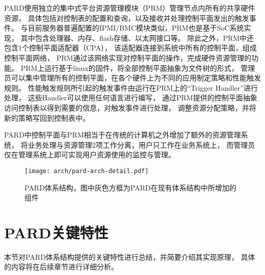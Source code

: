 PARD使用独立的集中式平台资源管理模块（PRM）管理节点内所有的共享硬件资源，
具体包括对控制表的配置和查询，以及接收并处理控制平面发出的触发事件。
与目前服务器普遍配置的IPMI/BMC模块类似，PRM也是基于SoC系统实现，
其中包含处理器、内存、flash存储、以太网接口等。
除此之外，PRM中还包含1个控制平面适配器（CPA），
该适配器连接到系统中所有的控制平面，组成控制平面网络，
PRM通过该网络实现对控制平面的操作，完成硬件资源管理的功能。
PRM上运行基于linux的固件，将全部控制平面抽象为文件树的形式，
管理员可以集中管理所有的控制平面，在各个硬件上为不同的应用制定策略和性能触发规则。
性能触发规则所引起的触发事件由运行在PRM上的``Trigger Handler''进行处理，
这些Handler可以使用任何语言进行编写，
通过PRM提供的控制平面抽象访问控制表以得到需要的信息，对触发事件进行处理，
调整资源分配策略，并将新的策略写回到控制表中。

PARD中控制平面与PRM相当于在传统的计算机之外增加了额外的资源管理系统，
将业务处理与资源管理2项工作分离，用户只工作在业务系统上，
而管理员仅在管理系统上即可实现用户资源使用的监控与管理。

\begin{figure}[t]
  \centering
  \texttt{[image: arch/pard-arch-detail.pdf]}
  \caption[PARD体系结构]{PARD体系结构，图中灰色方框为PARD在现有体系结构中所增加的组件}
  \label{fig:pard-arch-detail}
\end{figure}



\section{PARD关键特性}

本节对PARD体系结构提供的关键特性进行总结，并简要介绍其实现原理，
具体的内容将在后续章节进行详细分析。


